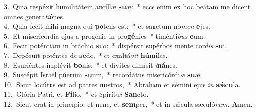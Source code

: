 {3.~}Quia respéxit humilitátem ancíllæ \textbf{su}æ:~* ecce enim ex hoc beátam me dicent omnes genera\textit{ti}\textbf{ó}nes.\\
{4.~}Quia fecit mihi magna qui \textbf{po}tens est:~* et sanctum no\textit{men} \textbf{e}jus.\\
{5.~}Et misericórdia ejus a progénie in pro\textbf{gé}nies~* timénti\textit{bus} \textbf{e}um.\\
{6.~}Fecit poténtiam in bráchio \textbf{su}o:~* dispérsit supérbos mente cor\textit{dis} \textbf{su}i.\\
{7.~}Depósuit poténtes de \textbf{se}de,~* et exaltá\textit{vit} \textbf{hú}\textbf{mi}les.\\
{8.~}Esuriéntes implévit \textbf{bo}nis:~* et dívites dimísit \textit{i}\textbf{ná}nes.\\
{9.~}Suscépit Israël púerum \textbf{su}um,~* recordátus misericórdi\textit{æ} \textbf{su}æ.\\
{10.~}Sicut locútus est ad patres \textbf{no}stros,~* Abraham et sémini ejus \textit{in} \textbf{sǽ}\textbf{cu}la.\\
{11.~}Glória Patri, et \textbf{Fí}lio,~* et Spirítu\textit{i} \textbf{San}cto.\\
{12.~}Sicut erat in princípio, et nunc, et \textbf{sem}per,~* et in sǽcula sæculó\textit{rum}. \textbf{A}men.\\
